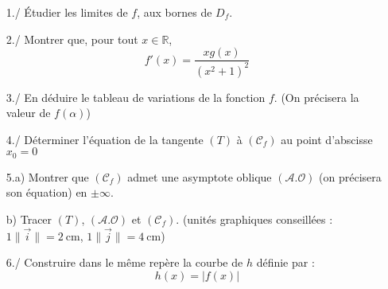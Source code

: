 \documentclass[a4paper,12pt]{article}
\begin{document}
\begin{enumerate}
    \item[1./] Étudier les limites de $f$, aux bornes de $D_f$.
    \item[2./] Montrer que, pour tout $x \in \mathbb{R}$, 
    \[
    f'(x) = \frac{xg(x)}{(x^2+1)^2}
    \]
    \item[3./] En déduire le tableau de variations de la fonction $f$. (On précisera la valeur de $f(\alpha)$)
    \item[4./] Déterminer l’équation de la tangente $(T)$ à $(\mathcal{C}_f)$ au point d’abscisse $x_0 = 0$
    \item[5.a)] Montrer que $(\mathcal{C}_f)$ admet une asymptote oblique $(\mathcal{A.O})$ (on précisera son équation) en $\pm\infty$.
    
    \item[b)] Tracer $(T)$, $(\mathcal{A.O})$ et $(\mathcal{C}_f)$. (unités graphiques conseillées : $1\| \vec{i} \| = 2~\text{cm}$, $1\| \vec{j} \| = 4~\text{cm}$)
    
    \item[6./] Construire dans le même repère la courbe de $h$ définie par : 
    \[
    h(x) = |f(x)|
    \]
\end{enumerate}
\end{document}
